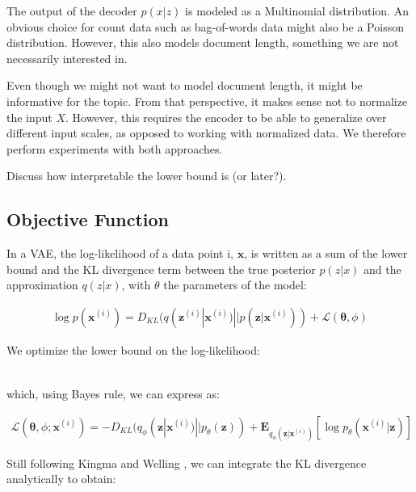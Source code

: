 \documentclass{report}
\begin{document}
	
	The output of the decoder $p(x|z)$ is modeled as a Multinomial distribution. An obvious choice for count data such as bag-of-words data might also be a Poisson distribution. However, this also models document length, something we are not necessarily interested in.  
	
	Even though we might not want to model document length, it might be informative for the topic. From that perspective, it makes sense not to normalize the input $X$. However, this requires the encoder to be able to generalize over different input scales, as opposed to working with normalized data. We therefore perform experiments with both approaches.
	
	Discuss how interpretable the lower bound is (or later?). 

	\subsection{Objective Function}
	
	In a VAE, the log-likelihood of a data point i, $\mathbf{x}$, is written as a sum of the lower bound and the KL divergence term between the true posterior $p(z|x)$ and the approximation $q(z|x)$, with $\theta$ the parameters of the model:
	
	\begin{align*}
	\log p(\mathbf{x}^{(i)}) = D_{KL}(q(\mathbf{z}^{(i)}|\mathbf{x}^{(i)}) || p(\mathbf{z}|\mathbf{x}^{(i)})) + \mathcal{L}(\mathbf{\theta}, \phi)
	\end{align*}
	
	We optimize the lower bound on the log-likelihood: 
	
	\begin{align}
	\end{align}
	
	which, using Bayes rule, we can express as:
	
	\begin{align}
	\mathcal{L}(\mathbf{\theta}, \phi; \mathbf{x}^{(i)}) = -D_{KL}(q_\phi (\mathbf{z}| \mathbf{x}^{(i)})||p_\theta (\mathbf{z})) + \mathbf{E}_{q_\phi(\mathbf{z}|\mathbf{x}^{(i)})}[\log p_\theta (\mathbf{x}^{(i)}|\mathbf{z})]
	\end{align}

	
	
	Still following Kingma and Welling \cite{kingma2013auto}, we can integrate the KL divergence analytically to obtain: \\
	
\end{document}
